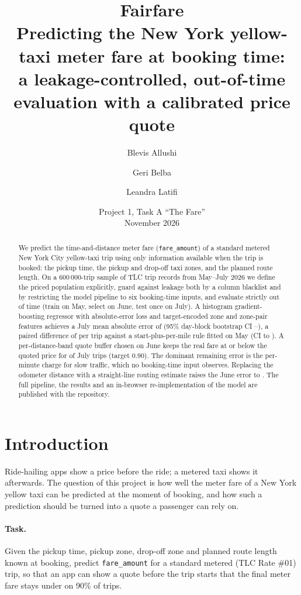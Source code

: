 \documentclass[11pt,a4paper]{article}
\title{\textbf{Fairfare}\\[4pt]\large Predicting the New York yellow-taxi meter fare at booking time:\\
a leakage-controlled, out-of-time evaluation with a calibrated price quote}
\author{Blevis Allushi \and Geri Belba \and Leandra Latifi}
\date{Project 1, Task A ``The Fare'' \\ November 2026}
\newcommand{\POSNUM}[1]{#1}\newcommand{\NEGNUM}[1]{\textminus#1}
\newcommand{\money}[1]{{\renewcommand{\POSNUM}[1]{\$##1}\renewcommand{\NEGNUM}[1]{\textminus\$##1}#1}}%
\newcommand{\code}[1]{\texttt{#1}}
\begin{document}
\maketitle

\begin{abstract}
\noindent We predict the time-and-distance meter fare (\code{fare\_amount}) of a standard metered New York City yellow-taxi trip using only information available when the trip is booked: the pickup time, the pickup and drop-off taxi zones, and the planned route length. On a 600\,000-trip sample of TLC trip records from May--July 2026 we define the priced population explicitly, guard against leakage both by a column blacklist and by restricting the model pipeline to six booking-time inputs, and evaluate strictly out of time (train on May, select on June, test once on July). A histogram gradient-boosting regressor with absolute-error loss and target-encoded zone and zone-pair features achieves a July mean absolute error of \money{\JulyFinalMae} (95\% day-block bootstrap CI \money{\JulyVsMedianMaemodelLo}--\money{\JulyVsMedianMaemodelHi}), a paired difference of \money{\JulyVsRuleMaediffPoint} per trip against a start-plus-per-mile rule fitted on May (CI \money{\JulyVsRuleMaediffLo} to \money{\JulyVsRuleMaediffHi}). A per-distance-band quote buffer chosen on June keeps the real fare at or below the quoted price for \JulyQuoteCoverage{} of July trips (target 0.90). The dominant remaining error is the per-minute charge for slow traffic, which no booking-time input observes. Replacing the odometer distance with a straight-line routing estimate raises the June error to \money{\RouterEstMae}. The full pipeline, the results and an in-browser re-implementation of the model are published with the repository.
\end{abstract}

\tableofcontents
\newpage

\section{Introduction}
Ride-hailing apps show a price before the ride; a metered taxi shows it afterwards. The question of this project is how well the meter fare of a New York yellow taxi can be predicted at the moment of booking, and how such a prediction should be turned into a quote a passenger can rely on.

\paragraph{Task.} Given the pickup time, pickup zone, drop-off zone and planned route length known at booking, predict \code{fare\_amount} for a standard metered (TLC Rate \#01) trip, so that an app can show a quote before the trip starts that the final meter fare stays under on 90\% of trips.
\end{document}
